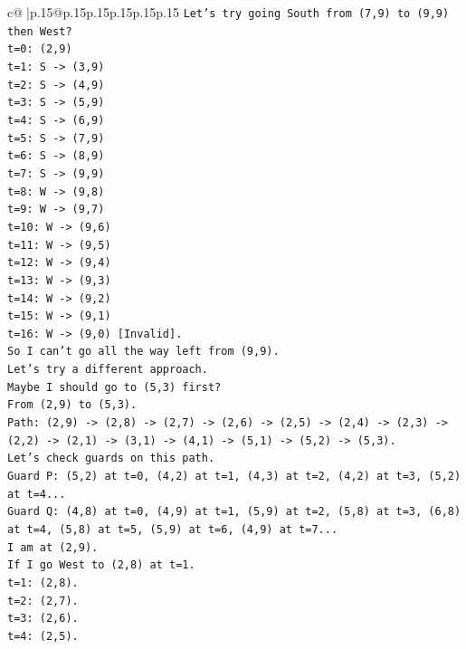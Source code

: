 \documentclass{article}
\begin{document}
{\begin{supertabular}{c@{$\;$}|p{.15\linewidth}@{}p{.15\linewidth}p{.15\linewidth}p{.15\linewidth}p{.15\linewidth}p{.15\linewidth}}
{{{\texttt{Let's try going South from (7,9) to (9,9) then West?} \\
\texttt{t=0: (2,9)} \\
\texttt{t=1: S {-}> (3,9)} \\
\texttt{t=2: S {-}> (4,9)} \\
\texttt{t=3: S {-}> (5,9)} \\
\texttt{t=4: S {-}> (6,9)} \\
\texttt{t=5: S {-}> (7,9)} \\
\texttt{t=6: S {-}> (8,9)} \\
\texttt{t=7: S {-}> (9,9)} \\
\texttt{t=8: W {-}> (9,8)} \\
\texttt{t=9: W {-}> (9,7)} \\
\texttt{t=10: W {-}> (9,6)} \\
\texttt{t=11: W {-}> (9,5)} \\
\texttt{t=12: W {-}> (9,4)} \\
\texttt{t=13: W {-}> (9,3)} \\
\texttt{t=14: W {-}> (9,2)} \\
\texttt{t=15: W {-}> (9,1)} \\
\texttt{t=16: W {-}> (9,0) {[}Invalid{]}.} \\
\texttt{So I can't go all the way left from (9,9).} \\
\texttt{Let's try a different approach.} \\
\texttt{Maybe I should go to (5,3) first?} \\
\texttt{From (2,9) to (5,3).} \\
\texttt{Path: (2,9) {-}> (2,8) {-}> (2,7) {-}> (2,6) {-}> (2,5) {-}> (2,4) {-}> (2,3) {-}> (2,2) {-}> (2,1) {-}> (3,1) {-}> (4,1) {-}> (5,1) {-}> (5,2) {-}> (5,3).} \\
\texttt{Let's check guards on this path.} \\
\texttt{Guard P: (5,2) at t=0, (4,2) at t=1, (4,3) at t=2, (4,2) at t=3, (5,2) at t=4...} \\
\texttt{Guard Q: (4,8) at t=0, (4,9) at t=1, (5,9) at t=2, (5,8) at t=3, (6,8) at t=4, (5,8) at t=5, (5,9) at t=6, (4,9) at t=7...} \\
\texttt{I am at (2,9).} \\
\texttt{If I go West to (2,8) at t=1.} \\
\texttt{t=1: (2,8).} \\
\texttt{t=2: (2,7).} \\
\texttt{t=3: (2,6).} \\
\texttt{t=4: (2,5).} \\
}}}
\end{supertabular}}
\end{document}
